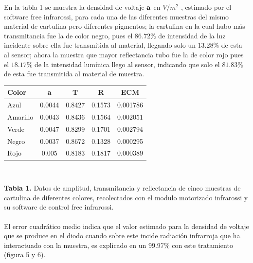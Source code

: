 \documentclass[12]{article}
\newenvironment{Figure}
{\par\medskip\noindent\minipage{\linewidth}}
{\endminipage\par\medskip}
\begin{document}
\begin{multicols}{2}
\begin{Figure}
\begin{tabular}{|l|r|}
\end{tabular}
\label{fig:g4}
\end{Figure}
En la tabla 1 se muestra  la densidad de voltaje $\bf{a}$ en $V/m^{2}$ , estimado por el software free infrarossi, para cada una de las diferentes muestras del mismo material de cartulina pero diferentes pigmentos; la cartulina en la cual hubo más transmitancia fue la de color negro, pues el $86.72\%$ de intensidad de la luz incidente sobre ella fue transmitida al material, llegando solo un $13.28\%$ de esta al sensor; ahora la muestra que mayor reflectancia tubo fue la de color rojo pues el $18.17\%$ de la intensidad lumínica llego al sensor, indicando que solo el $81.83\%$ de esta fue transmitida al material de muestra.
\begin{center}
\begin{tabular}{|l|c|c|c|c|} 
\hline
\bf{Color} & \textbf{a} & \bf{T} & \bf{R} & \textbf{ECM}\\
\hline
 Azul & 0.0044 & 0.8427 & 0.1573 & 0.001786\\
\hline
 Amarillo & 0.0043 & 0.8436  & 0.1564 & 0.002051\\
\hline
 Verde & 0.0047 & 0.8299  & 0.1701 & 0.002794\\
\hline 
 Negro & 0.0037 & 0.8672  & 0.1328 & 0.000295\\
\hline
Rojo & 0.005 & 0.8183  & 0.1817 & 0.000389\\
\hline
\hline
\end{tabular}
\\
\end{center}
\textbf{Tabla 1.} Datos  de amplitud, transmitancia y reflectancia de cinco muestras de cartulina de diferentes colores, recolectados con el modulo motorizado infrarossi y su software de control free infrarossi.\\ \\ 
El error cuadrático medio indica que el valor estimado para la densidad de voltaje que se produce en el diodo cuando sobre este incide radiación infrarroja que ha interactuado con la muestra, es explicado en un $99.97\%$ con este tratamiento (figura 5 y 6).  
\begin{Figure}	
\center
\begin{tabular}{|l|r|}

\end{tabular}
\end{Figure}
\end{multicols}
\end{document}
